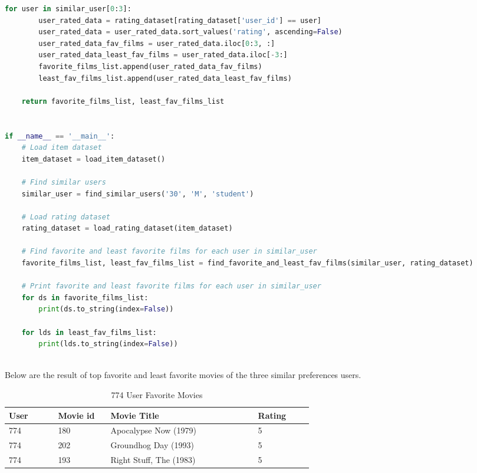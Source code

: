 \documentclass[12pt]{article}
\begin{document}
\begin{lstlisting}[language=Python, caption=Finding users with my preferences.]
    for user in similar_user[0:3]:
        user_rated_data = rating_dataset[rating_dataset['user_id'] == user]
        user_rated_data = user_rated_data.sort_values('rating', ascending=False)
        user_rated_data_fav_films = user_rated_data.iloc[0:3, :]
        user_rated_data_least_fav_films = user_rated_data.iloc[-3:]
        favorite_films_list.append(user_rated_data_fav_films)
        least_fav_films_list.append(user_rated_data_least_fav_films)
    
    return favorite_films_list, least_fav_films_list


if __name__ == '__main__':
    # Load item dataset
    item_dataset = load_item_dataset()
    
    # Find similar users
    similar_user = find_similar_users('30', 'M', 'student')
    
    # Load rating dataset
    rating_dataset = load_rating_dataset(item_dataset)
    
    # Find favorite and least favorite films for each user in similar_user
    favorite_films_list, least_fav_films_list = find_favorite_and_least_fav_films(similar_user, rating_dataset)
    
    # Print favorite and least favorite films for each user in similar_user
    for ds in favorite_films_list:
        print(ds.to_string(index=False))

    for lds in least_fav_films_list:
        print(lds.to_string(index=False))

\end{lstlisting}
\\
Below are the result of top favorite and least favorite movies of the three similar preferences users.
\\
\begin{table}[h]
\centering
\caption{774 User Favorite Movies}
\label{tbl:simple}
\begin{tabular}{p{0.10\linewidth}p{0.10\linewidth}p{0.30\linewidth}p{0.10\linewidth}}
\hline
\textbf{User} & \textbf{Movie id} & \textbf{Movie Title} & \textbf{Rating} \\ \hline \hline
774 & 180 & Apocalypse Now (1979) & 5 \\ \hline
774 & 202 & Groundhog Day (1993)  & 5 \\ \hline
774 & 193 & Right Stuff, The (1983) & 5 \\ \hline
\hline
\end{tabular}
\end{table}
\end{document}

